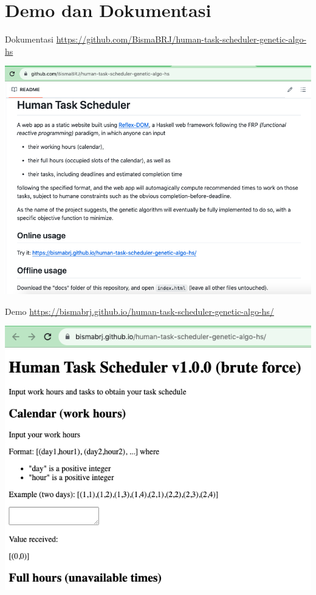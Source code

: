 \documentclass{beamer}
\begin{document}
\section{Demo dan Dokumentasi}

\begin{frame}{Dokumentasi}
    \url{https://github.com/BismaBRJ/human-task-scheduler-genetic-algo-hs}

    \includegraphics[scale=0.4]{dokumentasi.png}
\end{frame}

\begin{frame}{Demo}
    \url{https://bismabrj.github.io/human-task-scheduler-genetic-algo-hs/}

    \includegraphics[scale=0.4]{demo.png}
\end{frame}
\end{document}

